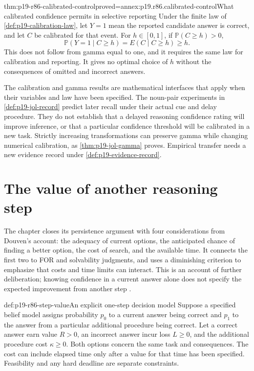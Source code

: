 \begin{hbtheorem}{thm:p19-r86-calibrated-control}{proved=annex:p19.r86.calibrated-control}{What calibrated confidence permits in selective reporting}
Under the finite law of \ref{def:p19-calibration-law}, let \(Y=1\)
mean the reported candidate answer is correct, and let \(C\) be calibrated
for that event. For \(h\in[0,1]\), if \(\mathbb P(C\geq h)>0\),
\[
       \mathbb P(Y=1\mid C\geq h)=E(C\mid C\geq h)\geq h.
\]
This does not follow from gamma equal to one, and it requires the same law
for calibration and reporting. It gives no optimal choice of \(h\) without
the consequences of omitted and incorrect answers.
\end{hbtheorem}

The calibration and gamma results are mathematical interfaces that apply when
their variables and law have been specified. The noun-pair experiments in
\ref{def:p19-jol-record} predict later recall under their actual cue and
delay procedure. They do not establish that a delayed reasoning confidence
rating will improve inference, or that a particular confidence threshold will
be calibrated in a new task. Strictly increasing transformations can preserve
gamma while changing numerical calibration, as
\ref{thm:p19-jol-gamma} proves. Empirical transfer needs a new evidence record
under \ref{def:p19-evidence-record}.

\section{The value of another reasoning step}
\label{sec:p19-r86-further-deliberation}

The chapter closes its persistence argument with four considerations from
Douven's account: the adequacy of current options, the anticipated chance of
finding a better option, the cost of search, and the available time. It connects
the first two to FOR and solvability judgments, and uses a diminishing
criterion to emphasize that costs and time limits can interact. This is an
account of further deliberation; knowing confidence in a current answer alone
does not specify the expected improvement from another step
\cite[pp.~522--523]{ThompsonElqayamAckerman2021MetaReasoning}.

\begin{hbdefinition}{def:p19-r86-step-value}{An explicit one-step decision model}
Suppose a specified belief model assigns probability \(p_0\) to a current
answer being correct and \(p_1\) to the answer from a particular additional
procedure being correct. Let a correct answer earn value \(R>0\), an
incorrect answer incur loss \(L\geq0\), and the additional procedure
cost \(\kappa\geq0\). Both options concern the same task and consequences.
The cost can include elapsed time only after a value for that time has been
specified. Feasibility and any hard deadline are separate constraints.
\end{hbdefinition}

